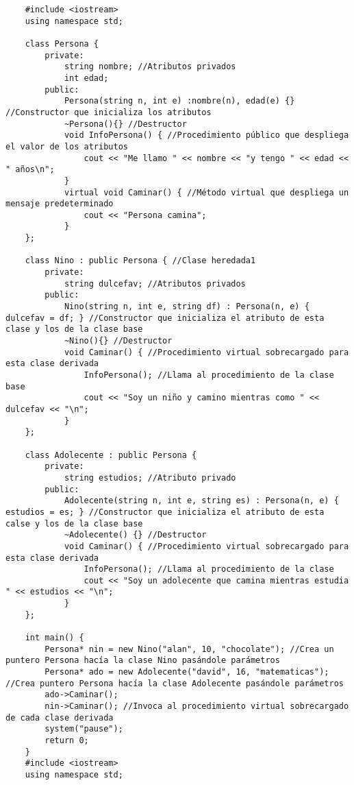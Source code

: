 \begin{lstlisting}
    #include <iostream>
    using namespace std;
    
    class Persona {
        private:
            string nombre; //Atributos privados
            int edad;
        public:
            Persona(string n, int e) :nombre(n), edad(e) {} //Constructor que inicializa los atributos
            ~Persona(){} //Destructor
            void InfoPersona() { //Procedimiento público que despliega el valor de los atributos
                cout << "Me llamo " << nombre << "y tengo " << edad << " años\n";
            }
            virtual void Caminar() { //Método virtual que despliega un mensaje predeterminado
                cout << "Persona camina";
            }
    };

    class Nino : public Persona { //Clase heredada1
        private:
            string dulcefav; //Atributos privados
        public:
            Nino(string n, int e, string df) : Persona(n, e) { dulcefav = df; } //Constructor que inicializa el atributo de esta clase y los de la clase base
            ~Nino(){} //Destructor
            void Caminar() { //Procedimiento virtual sobrecargado para esta clase derivada
                InfoPersona(); //Llama al procedimiento de la clase base
                cout << "Soy un niño y camino mientras como " << dulcefav << "\n";
            }
    };

    class Adolecente : public Persona {
        private:
            string estudios; //Atributo privado
        public:
            Adolecente(string n, int e, string es) : Persona(n, e) { estudios = es; } //Constructor que inicializa el atributo de esta calse y los de la clase base
            ~Adolecente() {} //Destructor
            void Caminar() { //Procedimiento virtual sobrecargado para esta clase derivada
                InfoPersona(); //Llama al procedimiento de la clase
                cout << "Soy un adolecente que camina mientras estudia " << estudios << "\n";
            }
    };

    int main() {
        Persona* nin = new Nino("alan", 10, "chocolate"); //Crea un puntero Persona hacía la clase Nino pasándole parámetros
        Persona* ado = new Adolecente("david", 16, "matematicas"); //Crea puntero Persona hacía la clase Adolecente pasándole parámetros
        ado->Caminar();
        nin->Caminar(); //Invoca al procedimiento virtual sobrecargado de cada clase derivada
        system("pause");
        return 0;
    }
    #include <iostream>
    using namespace std;
    

\end{lstlisting}
